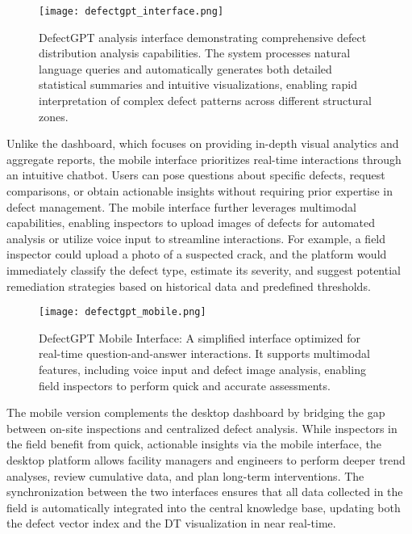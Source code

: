 \documentclass[a4paper,fleqn]{cas-sc}
\begin{document}
\begin{figure}[htbp]
    \centering

        \texttt{[image: defectgpt\_interface.png]}

        \caption{DefectGPT analysis interface demonstrating comprehensive defect distribution analysis capabilities. The system processes natural language queries and automatically generates both detailed statistical summaries and intuitive visualizations, enabling rapid interpretation of complex defect patterns across different structural zones.}
    \label{fig:defectgpt_analysis}
\end{figure}

Unlike the dashboard, which focuses on providing in-depth visual analytics and aggregate reports, the mobile interface prioritizes real-time interactions through an intuitive chatbot. Users can pose questions about specific defects, request comparisons, or obtain actionable insights without requiring prior expertise in defect management. The mobile interface further leverages multimodal capabilities, enabling inspectors to upload images of defects for automated analysis or utilize voice input to streamline interactions. For example, a field inspector could upload a photo of a suspected crack, and the platform would immediately classify the defect type, estimate its severity, and suggest potential remediation strategies based on historical data and predefined thresholds.

\begin{figure}
    \centering
    \texttt{[image: defectgpt\_mobile.png]}
    \caption{DefectGPT Mobile Interface: A simplified interface optimized for real-time question-and-answer interactions. It supports multimodal features, including voice input and defect image analysis, enabling field inspectors to perform quick and accurate assessments.}
    \label{fig:defectgpt_mobile}
\end{figure}

The mobile version complements the desktop dashboard by bridging the gap between on-site inspections and centralized defect analysis. While inspectors in the field benefit from quick, actionable insights via the mobile interface, the desktop platform allows facility managers and engineers to perform deeper trend analyses, review cumulative data, and plan long-term interventions. The synchronization between the two interfaces ensures that all data collected in the field is automatically integrated into the central knowledge base, updating both the defect vector index and the DT visualization in near real-time.
\end{document}
